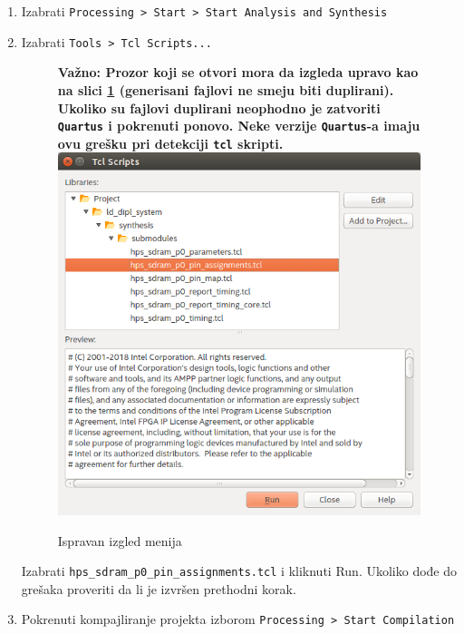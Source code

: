 \begin{enumerate}
\item  Izabrati \texttt{Processing > Start > Start Analysis and Synthesis}
\item  Izabrati \texttt{Tools > Tcl Scripts...}\\
\begin{figure}[h!]
\centering
\textbf{Važno: Prozor koji se otvori mora da izgleda upravo kao na slici \ref{slika:tcl} (generisani fajlovi ne smeju biti duplirani). Ukoliko su fajlovi duplirani neophodno je zatvoriti \texttt{Quartus} i pokrenuti ponovo. Neke verzije \texttt{Quartus}-a imaju ovu grešku pri detekciji \texttt{tcl} skripti.}\\
\includegraphics[scale=0.5]{img/tcl.png}
\caption{Ispravan izgled menija}
\label{slika:tcl}
\end{figure}
 
 Izabrati \texttt{hps\_sdram\_p0\_pin\_assignments.tcl} i kliknuti Run. Ukoliko dođe do grešaka proveriti da li je izvršen prethodni korak.
\item  Pokrenuti kompajliranje projekta izborom \texttt{Processing > Start Compilation}


\end{enumerate}
